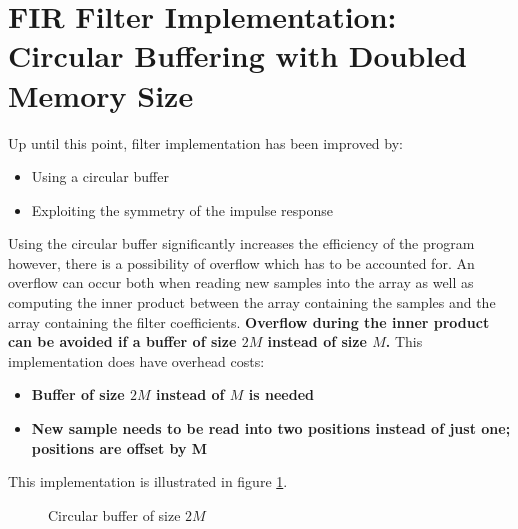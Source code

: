 \documentclass{article}
\begin{document}
\newpage
\section{FIR Filter Implementation: Circular Buffering with Doubled Memory Size}
Up until this point, filter implementation has been improved by:
\begin{itemize}
    \item Using a circular buffer
    \item Exploiting the symmetry of the impulse response 
\end{itemize}
Using the circular buffer significantly increases the efficiency of the program however, there is a possibility of overflow which has to be accounted for. An overflow can occur both when reading new samples into the array as well as computing the inner product between the array containing the samples and the array containing the filter coefficients. \textbf{Overflow during the inner product can be avoided if a buffer of size $2M$ instead of size $M$.} This implementation does have overhead costs:
\begin{itemize}
    \item \textbf{Buffer of size $2M$ instead of $M$ is needed}
    \item \textbf{New sample needs to be read into two positions instead of just one; positions are offset by M}
\end{itemize}

This implementation is illustrated in figure \ref{fig:double_mem_buff}.
 
\begin{figure}[H]
    \centering
    \caption{Circular buffer of size $2M$}
    \label{fig:double_mem_buff}
\end{figure}
\end{document}
